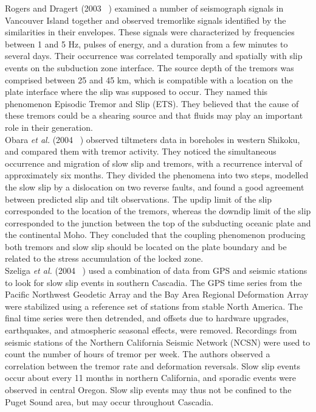 \documentclass[main.tex]{subfiles}
\begin{document}
Rogers and Dragert (2003 ~\cite{ROG_2003}) examined a number of seismograph signals in Vancouver Island together and observed tremorlike signals identified by the similarities in their envelopes. These signals were characterized by frequencies between 1 and 5 Hz, pulses of energy, and a duration from a few minutes to several days. Their occurrence was correlated temporally and spatially with slip events on the subduction zone interface. The source depth of the tremors was comprised between 25 and 45 km, which is compatible with a location on the plate interface where the slip was supposed to occur. They named this phenomenon Episodic Tremor and Slip (ETS). They believed that the cause of these tremors could be a shearing source and that fluids may play an important role in their generation. \\

Obara \textit{et al.} (2004 ~\cite{OBA_2004}) observed tiltmeters data in boreholes in western Shikoku, and compared them with tremor activity. They noticed the simultaneous occurrence and migration of slow slip and tremors, with a recurrence interval of approximately six months. They divided the phenomena into two steps, modelled the slow slip by a dislocation on two reverse faults, and found a good agreement between predicted slip and tilt observations. The updip limit of the slip corresponded to the location of the tremors, whereas the downdip limit of the slip corresponded to the junction between the top of the subducting oceanic plate and the continental Moho. They concluded that the coupling phenomenon producing both tremors and slow slip should be located on the plate boundary  and be related to the stress accumulation of the locked zone.\\

Szeliga \textit{et al.} (2004 ~\cite{SZE_2004}) used a combination  of data from GPS and seismic stations to look for slow slip events in southern Cascadia. The GPS time series from the Pacific Northwest Geodetic Array and the Bay Area Regional Deformation Array were stabilized using a reference set of stations from stable North America. The final time series were then detrended, and offsets due to hardware upgrades, earthquakes, and atmospheric seasonal effects, were removed. Recordings from seismic stations of the Northern California Seismic Network (NCSN) were used to count the number of hours of tremor per week. The authors observed a correlation between the tremor rate and deformation reversals. Slow slip events occur about every 11 months in northern California, and sporadic events were observed in central Oregon. Slow slip events may thus not be confined to the Puget Sound area, but may occur throughout Cascadia. \\
\end{document}
